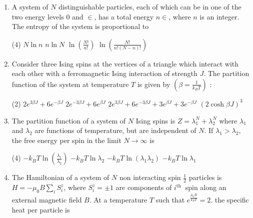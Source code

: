 \begin{enumerate}
{	}
 \begin{tasks}(4)
	\task[\textbf{a.}]$\frac{1}{2} N \ln 2$
	\task[\textbf{b.}] $2 \ln 2$
	\task[\textbf{c.}]$\frac{1}{2} \ln 2$
	\task[\textbf{d.}] $N \ln 2$	
\end{tasks}	
	\item A system of $N$ distinguishable particles, each of which can be in one of the two energy levels 0 and $\in$, has a total energy $n \in$, where $n$ is an integer. The entropy of the system is proportional to
	{	}
	 \begin{tasks}(4)
		\task[\textbf{a.}]$N \ln n$
		\task[\textbf{b.}]$n \ln N$
		\task[\textbf{c.}] $\ln \left(\frac{N !}{n !}\right)$
		\task[\textbf{d.}] $\ln \left(\frac{N !}{n !(N-n) !}\right)$
	\end{tasks}
\item Consider three Ising spins at the vertices of a triangle which interact with each other with a ferromagnetic Ising interaction of strength $J$. The partition function of the system at temperature $T$ is given by $\left(\beta=\frac{1}{k_{B} T}\right)$ :
{	}
 \begin{tasks}(2)
	\task[\textbf{a.}] $2 e^{3 \beta J}+6 e^{-\beta J}$
	\task[\textbf{b.}] $2 e^{-3 \beta J}+6 e^{\beta J}$
	\task[\textbf{c.}]$2 e^{3 \beta J}+6 e^{-3 \beta J}+3 e^{\beta J}+3 e^{-\beta J}$
	\task[\textbf{d.}] $(2 \cosh \beta J)^{3}$
\end{tasks}
\item The partition function of a system of $N$ Ising spins is $Z=\lambda_{1}^{N}+\lambda_{2}^{N}$ where $\lambda_{1}$ and $\lambda_{2}$ are functions of temperature, but are independent of $N$. If $\lambda_{1}>\lambda_{2}$, the free energy per spin in the limit $N \rightarrow \infty$ is
{	}
 \begin{tasks}(4)
	\task[\textbf{a.}]$-k_{B} T \ln \left(\frac{\lambda_{1}}{\lambda_{2}}\right)$
	\task[\textbf{b.}] $-k_{B} T \ln \lambda_{2}$
	\task[\textbf{c.}]$-k_{B} T \ln \left(\lambda_{1} \lambda_{2}\right)$
	\task[\textbf{d.}] $-k_{B} T \ln \lambda_{1}$
\end{tasks}
\item The Hamiltonian of a system of $N$ non interacting spin $\frac{1}{2}$ particles is $H=-\mu_{0} B \sum_{i} S_{i}^{z}$, where $S_{i}^{z}=\pm 1$ are components of $i^{\text {th }}$ spin along an external magnetic field $B$. At a temperature $T$ such that $e^{\frac{\mu_{0} B}{k_{B} T}}=2$. the specific heat per particle is

\end{enumerate}
